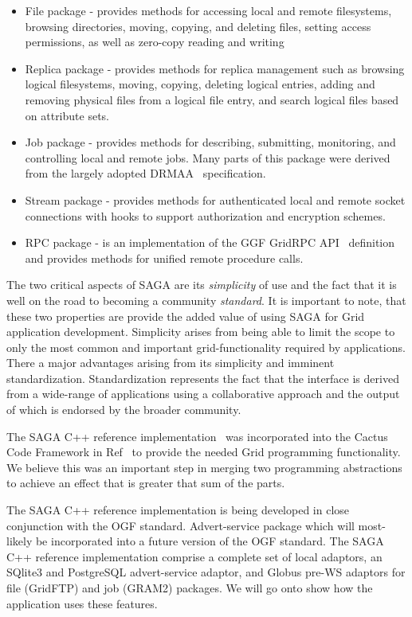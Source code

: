 \documentclass[conference,final]{IEEEtran}
\begin{document}
\begin{itemize}
\item File package - provides methods for accessing local and remote
  filesystems, browsing directories, moving, copying, and deleting
  files, setting access permissions, as well as zero-copy reading and
  writing
\item Replica package - provides methods for replica management such
  as browsing logical filesystems, moving, copying, deleting logical
  entries, adding and removing physical files from a logical file
  entry, and search logical files based on attribute sets.
\item Job package - provides methods for describing, submitting,
  monitoring, and controlling local and remote jobs. Many parts of
  this package were derived from the largely adopted
  DRMAA~\cite{drmaa_url} specification.
\item Stream package - provides methods for authenticated local and
  remote socket connections with hooks to support authorization and
  encryption schemes.
\item RPC package - is an implementation of the GGF GridRPC
  API~\cite{gridrpc_url} definition and provides methods for unified
  remote procedure calls.
\end{itemize}

The two critical aspects of SAGA are its {\it simplicity} of use and the
fact that it is well on the road to becoming a community {\it standard}.
It is important to note, that these two properties are 
provide the added value of using SAGA for Grid application development.
Simplicity arises from being able to limit the scope to only the most
common and important grid-functionality required by applications.
There a major advantages arising from its simplicity and imminent
standardization.  Standardization represents the fact that the
interface is derived from a wide-range of applications using a
collaborative approach and the output of which is endorsed by the
broader community.

The SAGA C++ reference implementation~\cite{saga_web} was incorporated
into the Cactus Code Framework in Ref~\cite{escience07} to provide the
needed Grid programming functionality.  We believe this was an
important step in merging two programming abstractions to achieve an
effect that is greater that sum of the parts.

The SAGA C++ reference implementation is being developed in close
conjunction with the OGF standard.  Advert-service package which will
most-likely be incorporated into a future version of the OGF standard.
The SAGA C++ reference implementation comprise a complete set of local
adaptors, an SQlite3 and PostgreSQL advert-service adaptor, and Globus
pre-WS adaptors for file (GridFTP) and job (GRAM2) packages. We will
go onto show how the application uses these features.
\end{document}
